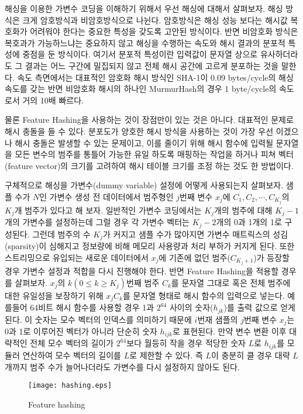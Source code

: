 \documentclass[oneside,b5paper,11pt]{book}
\theoremstyle{plain}
\theoremstyle{definition}
\theoremstyle{remark}
\theoremstyle{definition}
\numberwithin{equation}{chapter}
\begin{document}
해싱을 이용한 가변수 코딩을 이해하기 위해서 우선 해싱에 대해서 살펴보자. 해싱 방식은 크게 암호방식과 비암호방식으로 나뉜다. 암호방식은 해싱 성능 보다는 해시값 복호화가 어려워야 한다는 중요한 특성을 갖도록 고안된 방식이다. 반면 비암호화 방식은 복호과가 가능하느냐는 중요하지 않고 해싱을 수행하는 속도와 해시 결과의 분포적 특성에 중점을 둔 방식이다. 여기서 분포적 특성이란 입력값이 문자열 상으로 유사하더라도 그 결과는 어느 구간에 밀집되지 않고 전체 해시 공간에 고르게 분포하는 것을 말한다.\citep{Ramadhian2013} 속도 측면에서는 대표적인 암호화 해시 방식인 SHA-1이 0.09 bytes/cycle의 해싱 속도를 갖는 반면 비암호화 해시의 하나인 MurmurHash의 경우 1 byte/cycle의 속도로서 거의 10배 빠르다.

 물론 Feature Hashing을 사용하는 것이 장점만이 있는 것은 아니다. 대표적인 문제로 해시 충돌을 들 수 있다. 분포도가 양호한 해시 방식을 사용하는 것이 가장 우선 이겠으나 해시 충돌은 발생할 수 있는 문제이고, 이를 줄이기 위해 해시 함수에 입력될 문자열을 모든 변수의 범주를 통틀어 가능한 유일 하도록 매핑하는 작업을 하거나 피쳐 벡터(feature vector)의 크기를 고려하여 해시 테이블 크기를 조정 하는 것도 한 방법이다.

 구체적으로 해싱을 가변수(dummy variable) 설정에 어떻게 사용되는지 살펴보자. 샘플 수가 $N$인 가변수 생성 전 데이터에서 범주형인 $j$번째 변수 $x_j$에 $C_1 , C_2 , \cdots , C_{K_j}$의 $K_j$개 범주가 있다고 해 보자. 일반적인 가변수 코딩에서는 $K_j$개의 범주에 대해 $K_j - 1$개의 가변수를 설정하는데 그럴 경우 각 가변수 벡터는 $K_j - 2$개의 0과 1개의 1로 구성된다. 그런데 범주의 수 $K_j$가 커지고 샘플 수가 많아지면 가변수 매트릭스의 성김(sparsity)이 심해지고 정보량에 비해 메모리 사용량과 처리 부하가 커지게 된다. 또한 스트리밍으로 유입되는 새로운 데이터에서 $x_j$에 기존에 없던 범주($C_{K_j + 1}$)가 등장할 경우 가변수 설정과 적합을 다시 진행해야 한다.
 반면 Feature Hashing을 적용할 경우를 살펴보자. $x_j$의 $k(0 \leq k \geq K_j)$번째 범주 $C_k$를 문자열 그대로 혹은 전체 범주에 대한 유일성을 보장하기 위해 $x_j C_k$를 문자열 형태로 해시 함수의 입력으로 넣는다. 예를들어 64비트 해시 함수를 사용할 경우 1과 $2^{64}$ 사이의 숫자($h_{jk}$)를 출력 값으로 얻게 된다. 이 숫자는 모수 벡터의 인덱스를 의미하기 때문에 $i$번재 샘플의 $j$번째 변수 $x_j$는 0과 1로 이루어진 벡터가 아니라 단순히 숫자 $h_{ijk}$로 표현된다. 만약 변수 변환 이후 대략적인 전체 모수 벡터의 길이가 $2^{64}$보다 월등히 작을 경우 적당한 숫자 $L$로 $h_{ijk}$를 모듈러 연산하여 모수 벡터의 길이를 $L$로 제한할 수 있다. 즉 $L$이 충분히 클 경우 대략 $L$개까지 범주 수가 늘어나더라도 가변수를 다시 설정하지 않아도 된다.

\begin{figure}
	\begin{center}
	\texttt{[image: hashing.eps]} %
    \end{center}
	\caption{Feature hashing}
\end{figure}
\end{document}
